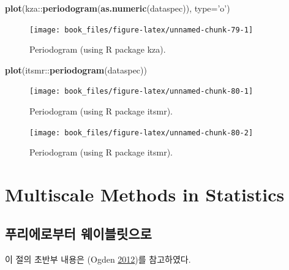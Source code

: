 \documentclass[b5paper,]{book}
\makeatletter
\newenvironment{Shaded}{\begin{snugshade}}{\end{snugshade}}
\newcommand{\KeywordTok}[1]{\textcolor[rgb]{0.13,0.29,0.53}{\textbf{{#1}}}}
\newcommand{\DataTypeTok}[1]{\textcolor[rgb]{0.13,0.29,0.53}{{#1}}}
\newcommand{\StringTok}[1]{\textcolor[rgb]{0.31,0.60,0.02}{{#1}}}
\newcommand{\NormalTok}[1]{{#1}}
\newenvironment{kframe}{%
\medskip{}
\setlength{\fboxsep}{.8em}
 \def\at@end@of@kframe{}%
 \ifinner\ifhmode%
  \def\at@end@of@kframe{\end{minipage}}%
  \begin{minipage}{\columnwidth}%
 \fi\fi%
 \def\FrameCommand##1{\hskip\@totalleftmargin \hskip-\fboxsep
 \colorbox{shadecolor}{##1}\hskip-\fboxsep
     \hskip-\linewidth \hskip-\@totalleftmargin \hskip\columnwidth}%
 \MakeFramed {\advance\hsize-\width
   \@totalleftmargin\z@ \linewidth\hsize
   \@setminipage}}%
 {\par\unskip\endMakeFramed%
 \at@end@of@kframe}
\renewenvironment{Shaded}{\begin{kframe}}{\end{kframe}}
\theoremstyle{definition}
\theoremstyle{definition}
\theoremstyle{definition}
\theoremstyle{remark}
\makeatother
\begin{document}
\begin{Shaded}
\begin{Highlighting}[]
\KeywordTok{plot}\NormalTok{(kza::}\KeywordTok{periodogram}\NormalTok{(}\KeywordTok{as.numeric}\NormalTok{(dataspec)), }\DataTypeTok{type=}\StringTok{'o'}\NormalTok{)}
\end{Highlighting}
\end{Shaded}

\begin{figure}

{\centering \texttt{[image: book\_files/figure-latex/unnamed-chunk-79-1]} 

}

\caption{Periodogram (using R package kza).}\label{fig:unnamed-chunk-79}
\end{figure}

\begin{Shaded}
\begin{Highlighting}[]
\KeywordTok{plot}\NormalTok{(itsmr::}\KeywordTok{periodogram}\NormalTok{(dataspec))}
\end{Highlighting}
\end{Shaded}

\begin{figure}

{\centering \texttt{[image: book\_files/figure-latex/unnamed-chunk-80-1]} 

}

\caption{Periodogram (using R package itsmr).}\label{fig:unnamed-chunk-801}
\end{figure}\begin{figure}

{\centering \texttt{[image: book\_files/figure-latex/unnamed-chunk-80-2]} 

}

\caption{Periodogram (using R package itsmr).}\label{fig:unnamed-chunk-802}
\end{figure}

\part{Multiscale Methods in
Statistics}\label{part-multiscale-methods-in-statistics}

\chapter{푸리에로부터 웨이블릿으로}\label{fouriertowavelet}

이 절의 초반부 내용은 (Ogden \protect\hyperlink{ref-Ogden2012}{2012})를
참고하였다.
\end{document}
